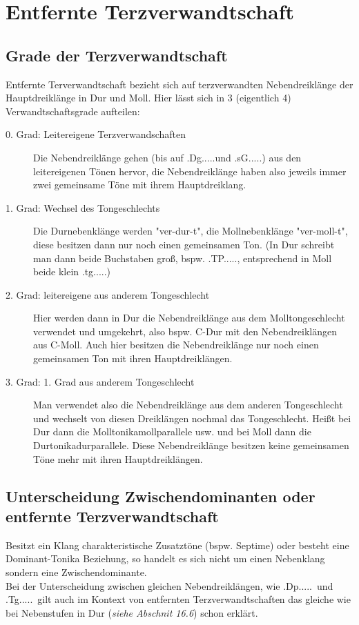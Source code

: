 \documentclass[a4paper]{article}
\newcommand{\bel}[5]{\HH.#1.#5.#2.#3.#4.}
\newcommand{\Tg}{\HH.Tg.....}
\newcommand{\Dp}{\HH.Dp.....}
\newcommand{\Dg}{\HH.Dg.....}
\begin{document}
	\section{Entfernte Terzverwandtschaft}
	\subsection{Grade der Terzverwandtschaft}
	Entfernte Terverwandtschaft bezieht sich auf terzverwandten Nebendreiklänge der Hauptdreiklänge in Dur und Moll. Hier lässt sich in 3 (eigentlich 4) Verwandtschaftsgrade aufteilen:
	\begin{description}
		\item[0. Grad: Leitereigene Terzverwandschaften] Die Nebendreiklänge gehen (bis auf \Dg und \bel{sG}{}{}{}{}) aus den leitereigenen Tönen hervor, die Nebendreiklänge haben also jeweils immer zwei gemeinsame Töne mit ihrem Hauptdreiklang.
		
		\item[1. Grad: Wechsel des Tongeschlechts] Die Durnebenklänge werden "ver-dur-t", die Mollnebenklänge "ver-moll-t", diese besitzen dann nur noch einen gemeinsamen Ton. (In Dur schreibt man dann beide Buchstaben groß, bspw. \bel{TP}{}{}{}{}, entsprechend in Moll beide klein \bel{tg}{}{}{}{})
		
		\item[2. Grad: leitereigene aus anderem Tongeschlecht] Hier werden dann in Dur die Nebendreiklänge aus dem Molltongeschlecht verwendet und umgekehrt, also bspw. C-Dur mit den Nebendreiklängen aus C-Moll. Auch hier besitzen die Nebendreiklänge nur noch einen gemeinsamen Ton mit ihren Hauptdreiklängen.
		
		\item[3. Grad: 1. Grad aus anderem Tongeschlecht] Man verwendet also die Nebendreiklänge aus dem anderen Tongeschlecht und wechselt von diesen Dreiklängen nochmal das Tongeschlecht. Heißt bei Dur dann die Molltonikamollparallele usw. und bei Moll dann die Durtonikadurparallele. Diese Nebendreiklänge besitzen keine gemeinsamen Töne mehr mit ihren Hauptdreiklängen.
	\end{description}

	\subsection{Unterscheidung Zwischendominanten oder entfernte Terzverwandtschaft}
	Besitzt ein Klang charakteristische Zusatztöne (bspw. Septime) oder besteht eine Dominant-Tonika Beziehung, so handelt es sich nicht um einen Nebenklang sondern eine Zwischendominante.\\
	Bei der Unterscheidung zwischen gleichen Nebendreiklängen, wie \Dp\ und \Tg\ gilt auch im Kontext von entfernten Terzverwandtschaften das gleiche wie bei Nebenstufen in Dur (\textit{siehe Abschnit 16.6}) schon erklärt.
	
\end{document}
